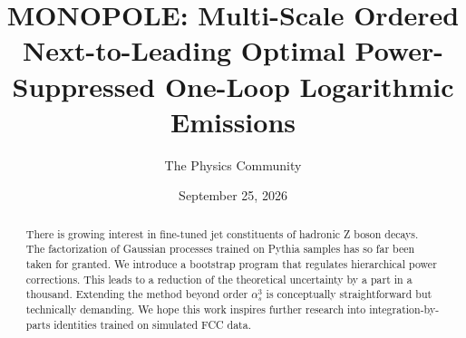 \documentclass[11pt]{article}
\title{MONOPOLE: Multi-Scale Ordered Next-to-Leading Optimal Power-Suppressed One-Loop Logarithmic Emissions}
\author{The Physics Community}
\date{September 25, 2026}
\numberwithin{equation}{section}
\theoremstyle{definition}
\theoremstyle{remark}
\begin{document}
\maketitle
\begin{abstract}
There is growing interest in fine-tuned jet constituents of hadronic Z
boson decays. The factorization of Gaussian processes trained on Pythia
samples has so far been taken for granted. We introduce a bootstrap
program that regulates hierarchical power corrections. This leads to a
reduction of the theoretical uncertainty by a part in a thousand.
Extending the method beyond order $\alpha_s^3$ is conceptually
straightforward but technically demanding. We hope this work inspires
further research into integration-by-parts identities trained on
simulated FCC data.
\end{abstract}
\tableofcontents






\nocite{*}


\end{document}
